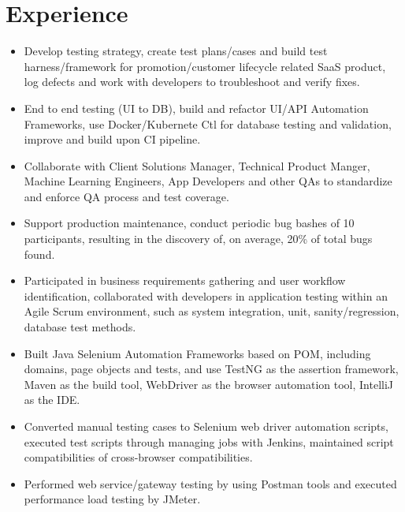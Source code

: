 \documentclass{resume}
\begin{document}
\section{Experience}
\begin{itemize}
  \item Develop testing strategy, create test plans/cases and build test harness/framework for promotion/customer lifecycle related SaaS product, log defects and work with developers to troubleshoot and verify fixes.
  \item End to end testing (UI to DB), build and refactor UI/API Automation Frameworks, use Docker/Kubernete Ctl for database testing and validation, improve and build upon CI pipeline.
  \item Collaborate with Client Solutions Manager, Technical Product Manger, Machine Learning Engineers, App Developers and other QAs to standardize and enforce QA process and test coverage.
  \item Support production maintenance, conduct periodic bug bashes of 10 participants, resulting in the discovery of, on average, 20\% of total bugs found.
\end{itemize}

\begin{itemize}
  \item Participated in business requirements gathering and user workflow identification, collaborated with developers in application testing within an Agile Scrum environment, such as system integration, unit, sanity/regression, database test methods.
  \item Built Java Selenium Automation Frameworks based on POM, including domains, page objects and tests, and use TestNG as the assertion framework, Maven as the build tool, WebDriver as the browser automation tool, IntelliJ as the IDE.
  \item Converted manual testing cases to Selenium web driver automation scripts, executed test scripts through managing jobs with Jenkins, maintained script compatibilities of cross-browser compatibilities.
  \item Performed web service/gateway testing by using Postman tools and executed performance load testing by JMeter.
\end{itemize}
\end{document}
